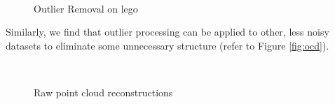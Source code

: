 \documentclass[conference,compsoc]{IEEEtran}
\begin{document}
\begin{figure}[ht!]
    \centering
    \
    \caption{Outlier Removal on lego}
    \label{fig:lego_out}
\end{figure}
Similarly, we find that outlier processing can be applied to other, less 
noisy datasets to eliminate some unnecessary structure (refer to Figure \ref{fig:ocd}).
\begin{figure}
    \centering
    \
    \
    \caption{Raw point cloud reconstructions}
    \label{fig:rcd}
\end{figure}
\end{document}
